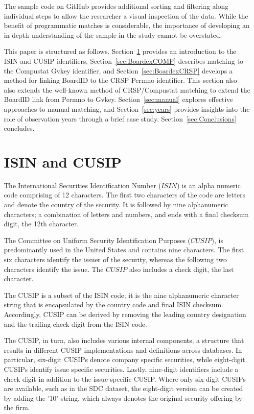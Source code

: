\documentclass[12pt]{article}
\begin{document}
The sample code on GitHub provides additional sorting and filtering along individual steps to allow the researcher a visual inspection of the data.
While the benefit of programmatic matches is considerable, the importance of developing an in-depth understanding of the sample in the study cannot be overstated.

This paper is structured as follows.
Section~\ref{sec:ISINCUSIP} provides an introduction to the ISIN and CUSIP identifiers, Section~\ref{sec:BoardexCOMP} describes matching to the Compustat Gvkey identifier, and Section~\ref{sec:BoardexCRSP} develops a method for linking BoardID to the CRSP Permno identifier.
This section also also extends the well-known method of CRSP/Compustat matching to extend the BoardID link from Permno to Gvkey.
Section~\ref{sec:manual} explores effective approaches to manual matching, and Section~\ref{sec:years} provides insights into the role of observation years through a brief case study.
Section~\ref{sec:Conclusions} concludes.


\section{ISIN and CUSIP}\label{sec:ISINCUSIP}

The International Securities Identification Number ($ISIN$) is an alpha numeric code comprising of 12 characters.
The first two characters of the code are letters and denote the country of the security.
It is followed by nine alphanumeric characters; a combination of letters and numbers, and ends with a final checksum digit, the 12th character.

The Committee on Uniform Security Identification Purposes ($CUSIP$), is predominantly used in the United States and contains nine characters.
The first six characters identify the issuer of the security, whereas the following two characters identify the issue.
The $CUSIP$ also includes a check digit, the last character.

The CUSIP is a subset of the ISIN code; it is the nine alphanumeric character string that is encapsulated by the country code and final ISIN checksum.
Accordingly, CUSIP can be derived by removing the leading country designation and the trailing check digit from the ISIN code.

The CUSIP, in turn, also includes various internal components, a structure that results in different CUSIP implementations and definitions across databases. 
In particular, six-digit CUSIPs denote company specific securities, while eight-digit CUSIPs identify issue specific securities.
Lastly, nine-digit identifiers include a check digit in addition to the issue-specific CUSIP.
Where only six-digit CUSIPs are available, such as in the SDC dataset, the eight-digit version can be created by adding the '10' string, which always denotes the original security offering by the firm.
\end{document}
